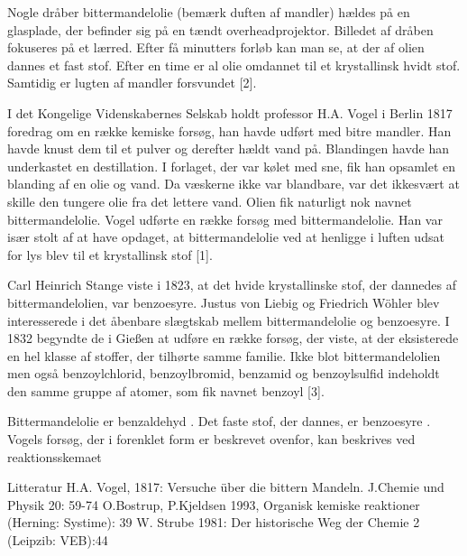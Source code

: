 



Nogle dråber bittermandelolie (bemærk duften af mandler) hældes på en glasplade, der befinder sig på en tændt overheadprojektor. Billedet af dråben fokuseres på et lærred.
Efter få minutters forløb kan man se, at der af olien dannes et fast stof. Efter en time er al olie omdannet til et krystallinsk hvidt stof. Samtidig er lugten af mandler forsvundet [2].


I det Kongelige Videnskabernes Selskab holdt professor H.A. Vogel i Berlin 1817 foredrag om en række kemiske forsøg, han havde udført med bitre mandler. Han havde knust dem til et pulver og derefter hældt vand på.
Blandingen havde han underkastet en destillation. I forlaget, der var kølet med sne, fik han opsamlet en blanding af en olie og vand. Da væskerne ikke var blandbare, var det ikkesvært at skille den tungere olie fra det lettere vand. Olien fik naturligt nok navnet bittermandelolie.
Vogel udførte en række forsøg med bittermandelolie. Han var især stolt af at have opdaget, at bittermandelolie ved at henligge i luften udsat for lys blev til et krystallinsk stof [1].

Carl Heinrich Stange viste i 1823, at det hvide krystallinske stof, der dannedes af bittermandelolien, var benzoesyre.
Justus von Liebig og Friedrich Wöhler blev interesserede i det åbenbare slægtskab mellem bittermandelolie og benzoesyre. I 1832 begyndte de i Gießen at udføre en række forsøg, der viste, at der eksisterede en hel klasse af stoffer, der tilhørte samme familie.
Ikke blot bittermandelolien men også benzoylchlorid, benzoylbromid, benzamid og benzoylsulfid indeholdt den samme gruppe af atomer, som fik navnet benzoyl [3].

Bittermandelolie er benzaldehyd . Det faste stof, der dannes, er benzoesyre . Vogels forsøg, der i forenklet form er beskrevet ovenfor, kan beskrives ved reaktionsskemaet



Litteratur
H.A. Vogel, 1817: Versuche über die bittern Mandeln. J.Chemie und Physik 20: 59-74
O.Bostrup, P.Kjeldsen 1993, Organisk kemiske reaktioner (Herning: Systime): 39
W. Strube 1981: Der historische Weg der Chemie 2 (Leipzib: VEB):44

